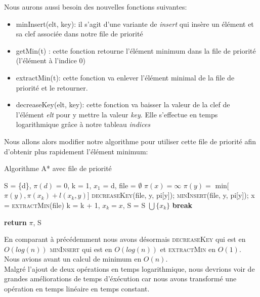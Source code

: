 \documentclass{article}
\begin{document}
Nous aurons aussi besoin des nouvelles fonctions suivantes:
\begin{itemize}
	\item minInsert(elt, key): il s'agit d'une variante de \textit{insert} qui insère un 
		élément et sa clef associée dans notre file de priorité
	\item getMin(t) : cette fonction retourne l'élément minimum dans la file de priorité (l'élément
		à l'indice 0)
	\item extractMin(t): cette fonction va enlever l'élément minimal de la file de priorité
			et le retourner.
	\item decreaseKey(elt, key): cette fonction va baisser la valeur de la clef de l'élément \textit{elt}
			pour y mettre la valeur \textit{key}. Elle s'effectue en temps logarithmique grâce à notre 
			tableau \textit{indices}\\
\end{itemize}

Nous allons alors modifier notre algorithme pour utiliser cette file de priorité afin d'obtenir
plus rapidement l'élément minimum:

\clearpage

\begin{algorithm}
\caption{Algorithme A* avec file de priorité}\label{astar_pq}
\begin{algorithmic}[1]
	\State S = \{d\}, $\pi(d)$ = 0, k = 1, $x_1$ = d, file = $\emptyset$
		\State $\pi(x) = \infty$
	\EndFor
			\State $\pi(y) = $ min[$\pi(y), \pi(x_k) + l(x_k, y)$]
				\State \textsc{decreaseKey}(file, y, pi[y]);
			\Else
				\State \textsc{minInsert}(file, y, pi[y]);
			\EndIf
		\EndFor
		\State x = \textsc{extractMin}(file)  
		\State k = k + 1, $x_k = x$, S = S $\bigcup \{x_k\}$
			\State \textbf{break}
		\EndIf
	\EndWhile
	
	\State \textbf{return} $\pi$, S
\EndProcedure 

\end{algorithmic}
\end{algorithm}

En comparant à précédemment nous avons désormais \textsc{decreaseKey} qui est en $O(log(n))$
\textsc{minInsert} qui est en $O(log(n))$ et \textsc{extractMin} en $O(1)$.\\
Nous avions avant un calcul de minimum en $O(n)$.\\
Malgré l'ajout de deux opérations en temps logarithmique, nous devrions voir de grandes 
améliorations de temps d'éxécution car nous avons transformé une opération en temps linéaire en
temps constant.
\end{document}
